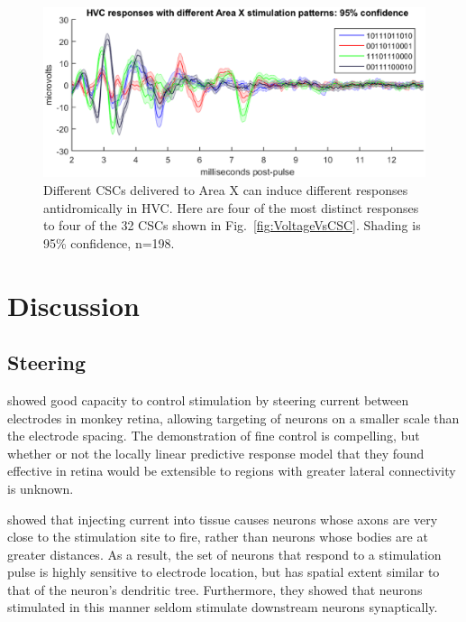\documentclass[10pt,letterpaper]{article}
\newcommand\fig[1]{Fig.~\ref{#1}}
\begin{document}
\begin{figure}
  \includegraphics[width=\textwidth]{HVCresponseVsCSC}
  \caption{Different CSCs delivered to Area X can induce different responses antidromically in HVC.  Here are four of the most distinct responses to four of the 32 CSCs shown in \fig{fig:VoltageVsCSC}.  Shading is 95\% confidence, n=198.}
  \label{fig:HVCresponseVsCSC}
\end{figure}


\section{Discussion}

\subsection{Steering}

\cite{Jepson2014steering_in_retina} showed good capacity to control stimulation by steering current between electrodes in monkey retina, allowing targeting of neurons on a smaller scale than the electrode spacing.  The demonstration of fine control is compelling, but whether or not the locally linear predictive response model that they found effective in retina would be extensible to regions with greater lateral connectivity is unknown.

\cite{Histed2009stimulation} showed that injecting current into tissue causes neurons whose axons are very close to the stimulation site to fire, rather than neurons whose bodies are at greater distances.  As a result, the set of neurons that respond to a stimulation pulse is highly sensitive to electrode location, but has spatial extent similar to that of the neuron's dendritic tree.  Furthermore, they showed that neurons stimulated in this manner seldom stimulate downstream neurons synaptically.
\end{document}
